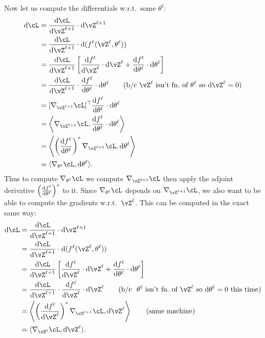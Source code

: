 \documentclass[../../book-main.tex]{subfiles}
\begin{document}
Now let us compute the differentials w.r.t.~some \(\theta^{\ell}\):
\begin{align}
    \odif{\cL}
    &= \odv{\cL}{\vZ^{\ell + 1}}\cdot \odif{\vZ^{\ell + 1}} \\ 
    &= \odv{\cL}{\vZ^{\ell + 1}}\cdot \odif{{(f^{\ell}(\vZ^{\ell}, \theta^{\ell}))}} \\
    &= \odv{\cL}{\vZ^{\ell + 1}}\bs{\odv{f^{\ell}}{\vZ^{\ell}}\cdot\odif{\vZ}^{\ell} + \odv{f^{\ell}}{\theta^{\ell}}\cdot\odif{\theta}^{\ell}} \\
    &= \odv{\cL}{\vZ^{\ell + 1}}\cdot \odv{f^{\ell}}{\theta^{\ell}}\cdot\odif{\theta}^{\ell} \qquad \text{(b/c~\(\vZ^{\ell}\) isn't fn.~of \(\theta^{\ell}\) so \(\odif{\vZ}^{\ell} = 0\))} \\
    &= [\nabla_{\vZ^{\ell + 1}}\cL]^{\top}\odv{f^{\ell}}{\theta^{\ell}}\cdot\odif{\theta}^{\ell} \\ 
    &= \ip*{\nabla_{\vZ^{\ell + 1}}\cL}{\odv{f^{\ell}}{\theta^{\ell}}\cdot\odif{\theta}^{\ell}} \\
    &= \ip*{\bp{\odv{f^{\ell}}{\theta^{\ell}}}^{*}\nabla_{\vZ^{\ell + 1}}\cL}{\odif{\theta}^{\ell}} \\ 
    &= \ip{\nabla_{\theta^{\ell}}\cL}{\odif{\theta}^{\ell}}.
\end{align}
Thus to compute \(\nabla_{\theta^{\ell}}\cL\) we compute \(\nabla_{\vZ^{\ell + 1}}\cL\) then apply the adjoint derivative \(\bp{\odv{f^{\ell}}{\theta^{\ell}}}^{*}\) to it. Since \(\nabla_{\theta^{\ell}}\cL\) depends on \(\nabla_{\vZ^{\ell + 1}}\cL\), we also want to be able to compute the gradients w.r.t.~\(\vZ^{\ell}\). This can be computed in the exact same way:
\begin{align}
    \odif{\cL}
    &= \odv{\cL}{\vZ^{\ell + 1}}\cdot \odif{\vZ^{\ell + 1}} \\ 
    &= \odv{\cL}{\vZ^{\ell + 1}}\cdot\odif{{(f^{\ell}(\vZ^{\ell}, \theta^{\ell}))}} \\
    &= \odv{\cL}{\vZ^{\ell + 1}}\bs{\odv{f^{\ell}}{\vZ^{\ell}}\cdot\odif{\vZ}^{\ell} + \odv{f^{\ell}}{\theta^{\ell}}\cdot\odif{\theta}^{\ell}} \\
    &= \odv{\cL}{\vZ^{\ell + 1}}\cdot\odv{f^{\ell}}{\vZ^{\ell}}\cdot\odif{\vZ}^{\ell} \qquad \text{(b/c~~\(\theta^{\ell}\) isn't fn.~of \(\vZ^{\ell}\) so \(\odif{\theta}^{\ell} = 0\) this time)} \\ 
    &= \ip*{\bp{\odv{f^{\ell}}{\vZ^{\ell}}}^{*}\nabla_{\vZ^{\ell + 1}}\cL}{\odif{\vZ}^{\ell}} \qquad \text{(same machine)} \\ 
    &= \ip{\nabla_{\vZ^{\ell}}\cL}{\odif{\vZ}^{\ell}}.
\end{align}
\end{document}
